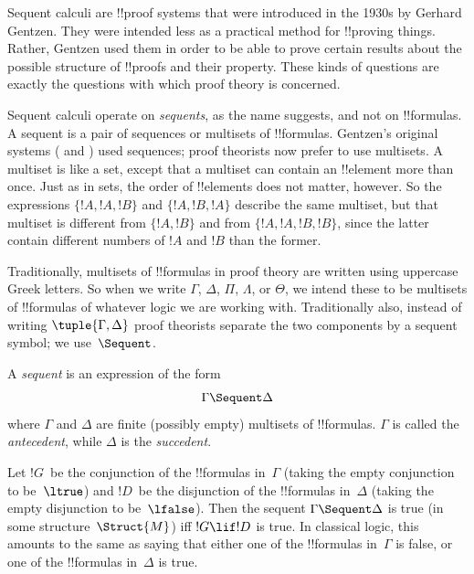 \documentclass[../../../include/open-logic-section]{subfiles}
\begin{document}


Sequent calculi are !!{proof} systems that were introduced in the
1930s by Gerhard Gentzen. They were intended less as a practical
method for !!{proving} things. Rather, Gentzen used them in order to
be able to prove certain results about the possible structure of
!!{proof}s and their property. These kinds of questions are
exactly the questions with which proof theory is concerned.

Sequent calculi operate on \emph{sequents}, as the name suggests, and
not on !!{formula}s. A sequent is a pair of sequences or multisets of
!!{formula}s. Gentzen's original systems ( and ) used
sequences; proof theorists now prefer to use multisets. A multiset is
like a set, except that a multiset can contain an !!{element} more
than once. Just as in sets, the order of !!{element}s does not matter,
however. So the expressions $\{!A, !A, !B\}$ and $\{!A, !B, !A\}$
describe the same multiset, but that multiset is different from $\{!A,
!B\}$ and from $\{!A, !A, !B, !B\}$, since the latter contain
different numbers of $!A$ and $!B$ than the former.

Traditionally, multisets of !!{formula}s in proof theory are written
using uppercase Greek letters. So when we write $\Gamma$, $\Delta$,
$\Pi$, $\Lambda$, or $\Theta$, we intend these to be multisets of
!!{formula}s of whatever logic we are working with. Traditionally
also, instead of writing $\tuple{\Gamma, \Delta}$ proof theorists
separate the two components by a sequent symbol; we use~$\Sequent$. 

\begin{defn}[Sequent]
A \emph{sequent} is an expression of the form
\[
\Gamma \Sequent \Delta
\]
where $\Gamma$ and $\Delta$ are finite (possibly empty) multisets of
!!{formula}s. $\Gamma$ is called the \emph{antecedent}, while
$\Delta$ is the \emph{succedent}.
\end{defn}

Let $!G$~be the conjunction of the !!{formula}s in~$\Gamma$ (taking
the empty conjunction to be~$\ltrue$) and $!D$~be the disjunction of
the !!{formula}s in~$\Delta$ (taking the empty disjunction to
be~$\lfalse$). Then the sequent $\Gamma \Sequent \Delta$ is true (in
some structure~$\Struct{M}$) iff $!G \lif !D$ is true. In classical
logic, this amounts to the same as saying that either one of the
!!{formula}s in~$\Gamma$ is false, or one of the !!{formula}s
in~$\Delta$ is true.
\end{document}
